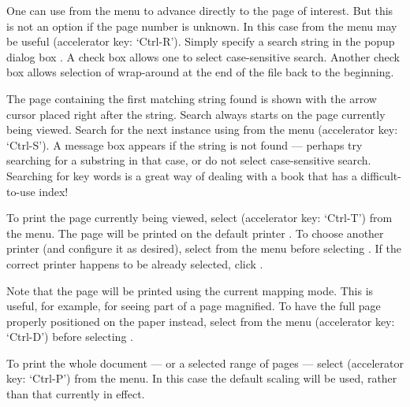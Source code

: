 
One can use  from the  menu 
to advance directly to the page of interest.  %
But this is not an option if the page number is unknown.
In this case  from the  menu may be useful 
(accelerator key: `Ctrl-R').
Simply specify a search string in the popup dialog box%
.
A check box allows one to select case-sensitive search.
Another check box allows selection of wrap-around at the end of the
file back to the beginning.

The page containing the first matching string found is shown with the
arrow cursor placed right after the string. %
Search always starts on the page currently being viewed.
Search for the next instance using  from the
 menu (accelerator key: `Ctrl-S').
A message box appears if the string is not found --- 
perhaps try searching for a substring in that case, 
or do not select case-sensitive search.
%
Searching for key words is a great way of dealing with a book that 
has a difficult-to-use index!


To print the page currently being viewed, select
 (accelerator key: `Ctrl-T')
from the  menu.
The page will be printed on the default printer%
.
To choose another printer (and configure it as desired),
select  from the  menu
before selecting .
If the correct printer happens to be %
already selected, click .

Note that the page will be printed using the current mapping mode. 
This is useful, for example, for seeing part of a page magnified.
To have the full page properly positioned on the paper instead,
select  from the  menu 
(accelerator key: `Ctrl-D') before selecting .


To print the whole document --- or a selected range of pages ---
select  
(accelerator key: `Ctrl-P') from the  menu.
In this case the default scaling will be used, rather than that
currently in effect.

